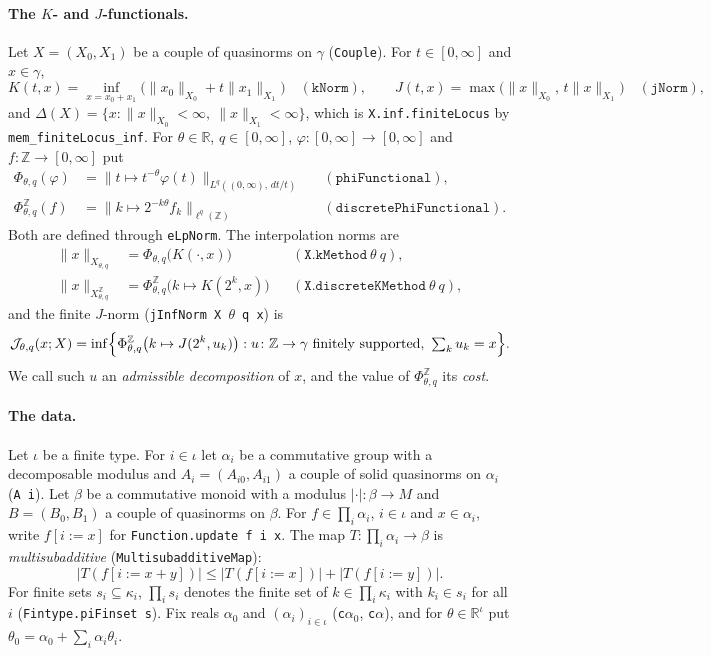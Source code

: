 \documentclass[11pt]{article}
\theoremstyle{definition}
\theoremstyle{remark}
\newcommand{\abs}[1]{\lvert #1\rvert}
\newcommand{\norm}[2]{\lVert #1\rVert_{#2}}
\newcommand{\cJ}{\mathcal J}
\newcommand{\Z}{\mathbb Z}
\newcommand{\R}{\mathbb R}
\newcommand{\upd}[3]{#1[#2 := #3]}
\begin{document}
\paragraph{The \(K\)- and \(J\)-functionals.}
Let \(X = (X_0, X_1)\) be a couple of quasinorms on \(\gamma\) (\texttt{Couple}). For
\(t \in [0,\infty]\) and \(x \in \gamma\),
\[
  K(t,x) = \inf_{x = x_0 + x_1}\bigl(\norm{x_0}{X_0} + t\norm{x_1}{X_1}\bigr)
  \quad(\texttt{kNorm}),
  \qquad
  J(t,x) = \max\bigl(\norm{x}{X_0},\, t\norm{x}{X_1}\bigr)
  \quad(\texttt{jNorm}),
\]
and \(\Delta(X) = \{x : \norm{x}{X_0} < \infty,\ \norm{x}{X_1} < \infty\}\), which is
\texttt{X.inf.finiteLocus} by \texttt{mem\_finiteLocus\_inf}. For \(\theta \in \R\),
\(q \in [0,\infty]\), \(\varphi\colon[0,\infty]\to[0,\infty]\) and
\(f\colon\Z\to[0,\infty]\) put
\begin{align*}
  \Phi_{\theta,q}(\varphi) &= \bigl\lVert t \mapsto t^{-\theta}\varphi(t)\bigr\rVert_{L^q((0,\infty),\,dt/t)}
  && (\texttt{phiFunctional}),\\
  \Phi^{\Z}_{\theta,q}(f) &= \bigl\lVert k \mapsto 2^{-k\theta} f_k\bigr\rVert_{\ell^q(\Z)}
  && (\texttt{discretePhiFunctional}).
\end{align*}
Both are defined through \texttt{eLpNorm}. The interpolation norms are
\begin{align*}
  \norm{x}{X_{\theta,q}} &= \Phi_{\theta,q}\bigl(K(\cdot,x)\bigr)
  && (\texttt{X.kMethod}\ \theta\ q),\\
  \norm{x}{X^{\Z}_{\theta,q}} &= \Phi^{\Z}_{\theta,q}\bigl(k \mapsto K(2^k,x)\bigr)
  && (\texttt{X.discreteKMethod}\ \theta\ q),
\end{align*}
and the finite \(J\)-norm (\texttt{jInfNorm X \(\theta\) q x}) is
\[
  \cJ_{\theta,q}(x; X) = \inf\Bigl\{\Phi^{\Z}_{\theta,q}\bigl(k \mapsto J(2^k,u_k)\bigr)
  : u\colon\Z\to\gamma \text{ finitely supported},\ \textstyle\sum_k u_k = x\Bigr\}.
\]
We call such \(u\) an \emph{admissible decomposition} of \(x\), and the value of
\(\Phi^{\Z}_{\theta,q}\) its \emph{cost}.

\paragraph{The data.}
Let \(\iota\) be a finite type. For \(i\in\iota\) let \(\alpha_i\) be a commutative group with a
decomposable modulus and \(A_i = (A_{i0}, A_{i1})\) a couple of solid quasinorms on
\(\alpha_i\) (\texttt{A i}). Let \(\beta\) be a commutative monoid with a modulus
\(\abs{\cdot}\colon\beta\to M\) and \(B = (B_0, B_1)\) a couple of quasinorms on \(\beta\).
For \(f \in \prod_i\alpha_i\), \(i\in\iota\) and \(x\in\alpha_i\), write \(\upd{f}{i}{x}\) for
\texttt{Function.update f i x}. The map \(T\colon\prod_i\alpha_i\to\beta\) is
\emph{multisubadditive} (\texttt{MultisubadditiveMap}):
\[
  \abs{T(\upd{f}{i}{x+y})} \le \abs{T(\upd{f}{i}{x})} + \abs{T(\upd{f}{i}{y})}.
\]
For finite sets \(s_i\subseteq\kappa_i\), \(\prod_i s_i\) denotes the finite set of
\(k\in\prod_i\kappa_i\) with \(k_i\in s_i\) for all \(i\) (\texttt{Fintype.piFinset s}).
Fix reals \(\alpha_0\) and \((\alpha_i)_{i\in\iota}\) (\texttt{c\(\alpha_0\)}, \texttt{c\(\alpha\)}),
and for \(\theta\in\R^\iota\) put \(\theta_0 = \alpha_0 + \sum_i \alpha_i\theta_i\).
\end{document}
